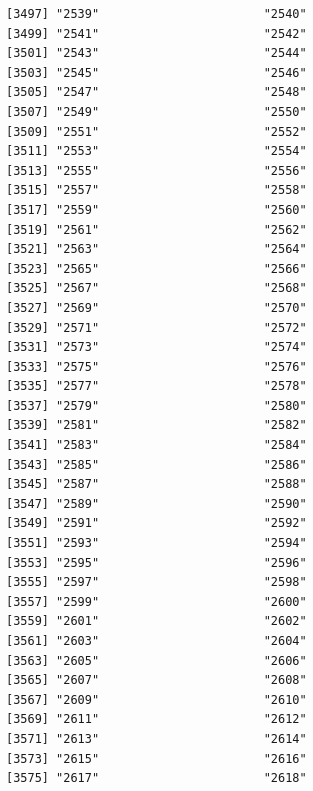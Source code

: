\documentclass[
  letterpaper,
  DIV=11,
  numbers=noendperiod]{scrreprt}
\begin{document}
\begin{verbatim}
[3497] "2539"                       "2540"                      
[3499] "2541"                       "2542"                      
[3501] "2543"                       "2544"                      
[3503] "2545"                       "2546"                      
[3505] "2547"                       "2548"                      
[3507] "2549"                       "2550"                      
[3509] "2551"                       "2552"                      
[3511] "2553"                       "2554"                      
[3513] "2555"                       "2556"                      
[3515] "2557"                       "2558"                      
[3517] "2559"                       "2560"                      
[3519] "2561"                       "2562"                      
[3521] "2563"                       "2564"                      
[3523] "2565"                       "2566"                      
[3525] "2567"                       "2568"                      
[3527] "2569"                       "2570"                      
[3529] "2571"                       "2572"                      
[3531] "2573"                       "2574"                      
[3533] "2575"                       "2576"                      
[3535] "2577"                       "2578"                      
[3537] "2579"                       "2580"                      
[3539] "2581"                       "2582"                      
[3541] "2583"                       "2584"                      
[3543] "2585"                       "2586"                      
[3545] "2587"                       "2588"                      
[3547] "2589"                       "2590"                      
[3549] "2591"                       "2592"                      
[3551] "2593"                       "2594"                      
[3553] "2595"                       "2596"                      
[3555] "2597"                       "2598"                      
[3557] "2599"                       "2600"                      
[3559] "2601"                       "2602"                      
[3561] "2603"                       "2604"                      
[3563] "2605"                       "2606"                      
[3565] "2607"                       "2608"                      
[3567] "2609"                       "2610"                      
[3569] "2611"                       "2612"                      
[3571] "2613"                       "2614"                      
[3573] "2615"                       "2616"                      
[3575] "2617"                       "2618"                      

\end{verbatim}
\end{document}
